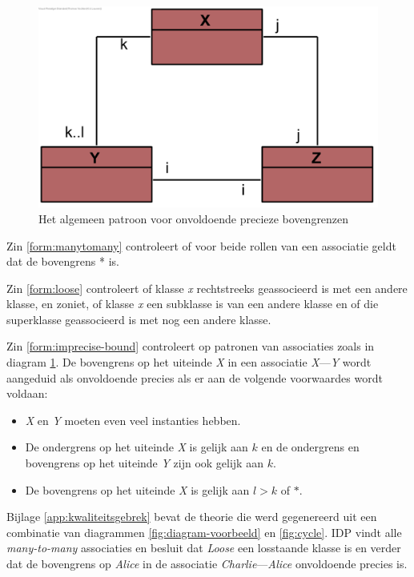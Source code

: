 \begin{figure}
	\centering
	\includegraphics{chap-kwaliteitsgebrek/cyclegen.png}
	\caption{Het algemeen patroon voor onvoldoende precieze bovengrenzen}
	\label{fig:cyclegen}
\end{figure}

Zin \ref{form:manytomany} controleert of voor beide rollen van een associatie geldt dat de bovengrens * is.

Zin \ref{form:loose} controleert of klasse \textit{x} rechtstreeks geassocieerd is met een andere klasse, en zoniet, of klasse \textit{x} een subklasse is van een andere klasse en of die superklasse geassocieerd is met nog een andere klasse.

Zin \ref{form:imprecise-bound} controleert op patronen van associaties zoals in diagram \ref{fig:cyclegen}. De bovengrens op het uiteinde \textit{X} in een associatie \textit{X}---\textit{Y} wordt aangeduid als onvoldoende precies als er aan de volgende voorwaardes wordt voldaan:

\begin{itemize}
	\item \textit{X} en \textit{Y} moeten even veel instanties hebben.
	\item De ondergrens op het uiteinde \textit{X} is gelijk aan $k$ en de ondergrens en bovengrens op het uiteinde \textit{Y} zijn ook gelijk aan $k$.
	\item De bovengrens op het uiteinde \textit{X} is gelijk aan $l > k$ of $*$.
\end{itemize}

Bijlage \ref{app:kwaliteitsgebrek} bevat de theorie die werd gegenereerd uit een combinatie van diagrammen \ref{fig:diagram-voorbeeld} en \ref{fig:cycle}. IDP
vindt alle \textit{many-to-many} associaties en besluit dat \textit{Loose} een losstaande klasse is en verder dat de bovengrens op \textit{Alice} in de associatie \textit{Charlie}---\textit{Alice} onvoldoende precies is.